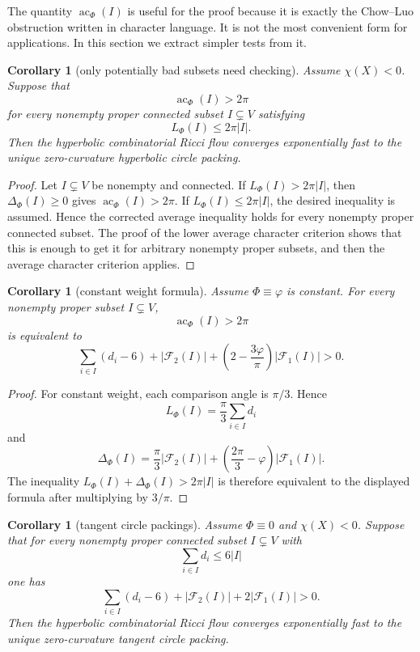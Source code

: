 \documentclass[11pt]{article}
\newtheorem{corollary}[theorem]{Corollary}
\newcommand{\Phiw}{\Phi}
\newcommand{\ac}{\operatorname{ac}}
\begin{document}
The quantity $\ac_\Phi(I)$ is useful for the proof because it is exactly
the Chow--Luo obstruction written in character language.  It is not the
most convenient form for applications.  In this section we extract simpler
tests from it.

\begin{corollary}[only potentially bad subsets need checking]
Assume $\chi(X)<0$.  Suppose that
\[
  \ac_\Phi(I)>2\pi
\]
for every nonempty proper connected subset $I\subsetneq V$ satisfying
\[
  L_\Phi(I)\le 2\pi |I|.
\]
Then the hyperbolic combinatorial Ricci flow converges exponentially fast
to the unique zero-curvature hyperbolic circle packing.
\end{corollary}

\begin{proof}
Let $I\subsetneq V$ be nonempty and connected.  If
$L_\Phi(I)>2\pi |I|$, then $\Delta_\Phi(I)\ge0$ gives
$\ac_\Phi(I)>2\pi$.  If $L_\Phi(I)\le2\pi |I|$, the desired inequality is
assumed.  Hence the corrected average inequality holds for every nonempty
proper connected subset.  The proof of the lower average character
criterion shows that this is enough to get it for arbitrary nonempty proper
subsets, and then the average character criterion applies.
\end{proof}

\begin{corollary}[constant weight formula]
Assume $\Phiw\equiv\varphi$ is constant.  For every nonempty proper
subset $I\subsetneq V$,
\[
  \ac_\Phi(I)>2\pi
\]
is equivalent to
\[
  \sum_{i\in I}(d_i-6)+|\mathcal F_2(I)|
  +\left(2-\frac{3\varphi}{\pi}\right)|\mathcal F_1(I)|>0.
\]
\end{corollary}

\begin{proof}
For constant weight, each comparison angle is $\pi/3$.  Hence
\[
  L_\Phi(I)=\frac{\pi}{3}\sum_{i\in I}d_i
\]
and
\[
  \Delta_\Phi(I)
  =
  \frac{\pi}{3}|\mathcal F_2(I)|
  +\left(\frac{2\pi}{3}-\varphi\right)|\mathcal F_1(I)|.
\]
The inequality $L_\Phi(I)+\Delta_\Phi(I)>2\pi |I|$ is therefore equivalent
to the displayed formula after multiplying by $3/\pi$.
\end{proof}

\begin{corollary}[tangent circle packings]
Assume $\Phiw\equiv0$ and $\chi(X)<0$.  Suppose that for every nonempty
proper connected subset $I\subsetneq V$ with
\[
  \sum_{i\in I}d_i\le 6|I|
\]
one has
\[
  \sum_{i\in I}(d_i-6)+|\mathcal F_2(I)|+2|\mathcal F_1(I)|>0.
\]
Then the hyperbolic combinatorial Ricci flow converges exponentially fast
to the unique zero-curvature tangent circle packing.
\end{corollary}
\end{document}
